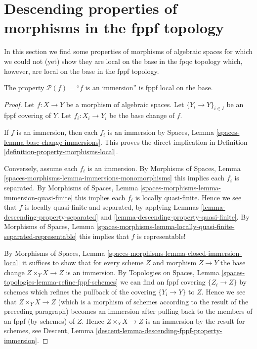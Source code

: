 \section{Descending properties of morphisms in the fppf topology}
\label{section-descending-properties-morphisms-fppf}

\noindent
In this section we find some properties of morphisms of algebraic spaces
for which we could not (yet) show they are local on the base in
the fpqc topology which, however, are local on the base
in the fppf topology.

\begin{lemma}
\label{lemma-descending-fppf-property-immersion}
The property $\mathcal{P}(f) =$``$f$ is an immersion''
is fppf local on the base.
\end{lemma}

\begin{proof}
Let $f : X \to Y$ be a morphism of algebraic spaces.
Let $\{Y_i \to Y\}_{i \in I}$ be an fppf covering of $Y$.
Let $f_i : X_i \to Y_i$ be the base change of $f$.

\medskip\noindent
If $f$ is an immersion, then each $f_i$ is an immersion by
Spaces, Lemma \ref{spaces-lemma-base-change-immersions}.
This proves the direct implication in
Definition \ref{definition-property-morphisms-local}.

\medskip\noindent
Conversely, assume each $f_i$ is an immersion. By
Morphisms of Spaces,
Lemma \ref{spaces-morphisms-lemma-immersions-monomorphisms}
this implies each $f_i$ is separated. By
Morphisms of Spaces,
Lemma \ref{spaces-morphisms-lemma-immersion-quasi-finite}
this implies each $f_i$ is locally quasi-finite.
Hence we see that $f$ is locally quasi-finite and separated, by applying
Lemmas \ref{lemma-descending-property-separated}
and \ref{lemma-descending-property-quasi-finite}.
By
Morphisms of Spaces, Lemma
\ref{spaces-morphisms-lemma-locally-quasi-finite-separated-representable}
this implies that $f$ is representable!

\medskip\noindent
By
Morphisms of Spaces, Lemma \ref{spaces-morphisms-lemma-closed-immersion-local}
it suffices to show that for every scheme $Z$ and morphism $Z \to Y$
the base change $Z \times_Y X \to Z$ is an immersion. By
Topologies on Spaces, Lemma \ref{spaces-topologies-lemma-refine-fppf-schemes}
we can find an fppf covering $\{Z_i \to Z\}$ by schemes which refines
the pullback of the covering $\{Y_i \to Y\}$ to $Z$.
Hence we see that $Z \times_Y X \to Z$ (which is a morphism of schemes
according to the result of the preceding paragraph) becomes an immersion
after pulling back to the members of an fppf (by schemes) of $Z$.
Hence $Z \times_Y X \to Z$ is an immersion by the result for schemes, see
Descent, Lemma \ref{descent-lemma-descending-fppf-property-immersion}.
\end{proof}

